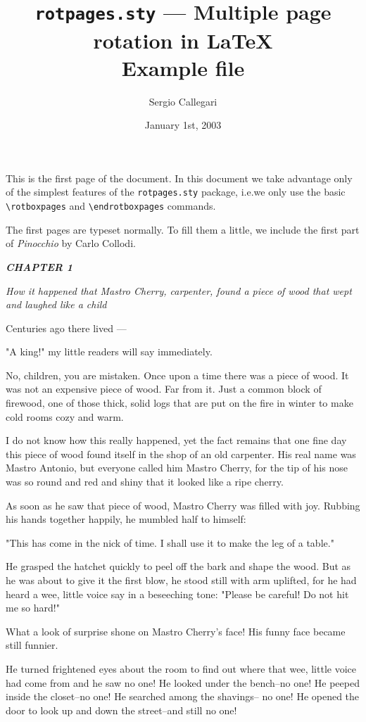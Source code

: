 \documentclass[12pt,twoside]{article}
\title{\texttt{rotpages.sty} --- Multiple page rotation in \LaTeX\\
  Example file}
\author{Sergio Callegari}
\date{January 1st, 2003}
\begin{document}
\sloppy
\pagestyle{fancy}
\maketitle
\thispagestyle{fancy}

This is the first page of the document. In this document we take
advantage only of the simplest features of the \texttt{rotpages.sty}
package, i.e.\@ we only use the basic \verb|\rotboxpages| and
\verb|\endrotboxpages| commands.


The first pages are typeset normally.  To fill them a little, we include
the first part of \emph{Pinocchio} by Carlo Collodi.

\bigskip
{\slshape%
  \textbf{CHAPTER 1}

  \emph{How it happened that Mastro Cherry, carpenter,
  found a piece of wood that wept and laughed like a child}
  \medskip

  Centuries ago there lived ---

  "A king!" my little readers will say immediately.

  No, children, you are mistaken.  Once upon a time
  there was a piece of wood.  It was not an expensive piece
  of wood.  Far from it.  Just a common block of firewood,
  one of those thick, solid logs that are put on the fire in
  winter to make cold rooms cozy and warm.

  I do not know how this really happened, yet the fact
  remains that one fine day this piece of wood found itself
  in the shop of an old carpenter.  His real name was
  Mastro Antonio, but everyone called him Mastro Cherry,
  for the tip of his nose was so round and red and shiny
  that it looked like a ripe cherry.

  As soon as he saw that piece of wood, Mastro Cherry
  was filled with joy.  Rubbing his hands together happily,
  he mumbled half to himself:

  "This has come in the nick of time.  I shall use it to
  make the leg of a table."

  He grasped the hatchet quickly to peel off the bark and
  shape the wood.  But as he was about to give it the first
  blow, he stood still with arm uplifted, for he had heard a
  wee, little voice say in a beseeching tone:  "Please be careful!
  Do not hit me so hard!"

  What a look of surprise shone on Mastro Cherry's
  face!  His funny face became still funnier.

  He turned frightened eyes about the room to find out
  where that wee, little voice had come from and he saw
  no one! He looked under the bench--no one! He peeped
  inside the closet--no one! He searched among the shavings--
  no one! He opened the door to look up and down
  the street--and still no one!

}
\end{document}
